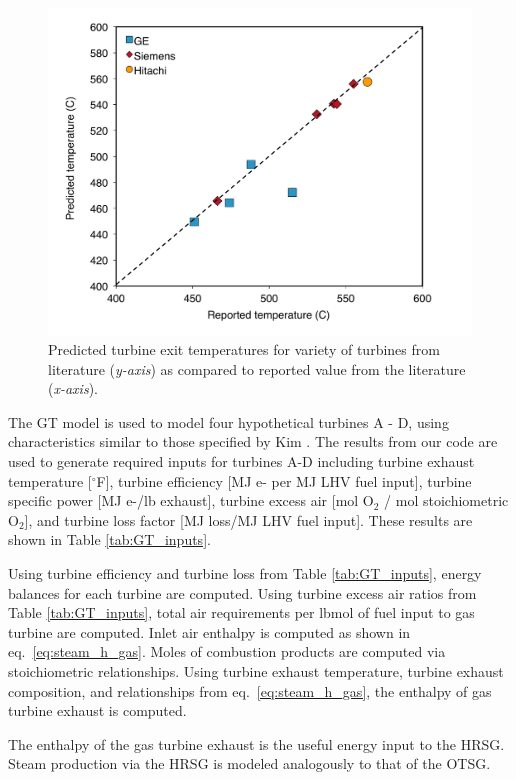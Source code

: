 \documentclass[11pt]{report}
\begin{document}
\begin{figure}[t]
\includegraphics[width=0.8\columnwidth]{images/GT_predictions.pdf}
\caption{Predicted turbine exit temperatures for variety of turbines from literature (\emph{y-axis}) as compared to reported value from the literature (\emph{x-axis}). }
\label{fig:GT_predictions}
\end{figure}

The GT model is used to model four hypothetical turbines A - D, using characteristics similar to those specified by Kim \cite{Kim2004}.  The results from our code are used to generate required inputs for turbines A-D including turbine exhaust temperature [$^\circ$F], turbine efficiency [MJ e- per MJ LHV fuel input], turbine specific power [MJ e-/lb exhaust], turbine excess air [mol O$_2$ / mol stoichiometric O$_2$], and turbine loss factor [MJ loss/MJ LHV fuel input]. These results are shown in Table \ref{tab:GT_inputs}.

Using turbine efficiency and turbine loss from Table \ref{tab:GT_inputs},  energy balances for each turbine are computed. Using turbine excess air ratios from Table \ref{tab:GT_inputs}, total air requirements per lbmol of fuel input to gas turbine are computed. Inlet air enthalpy is computed as shown in eq.\ \eqref{eq:steam_h_gas}. Moles of combustion products are computed via stoichiometric relationships.  Using turbine exhaust temperature, turbine exhaust composition, and relationships from eq.\ \eqref{eq:steam_h_gas}, the enthalpy of gas turbine exhaust is computed.

The enthalpy of the gas turbine exhaust is the useful energy input to the HRSG. Steam production via the HRSG is modeled analogously to that of the OTSG.
\end{document}
